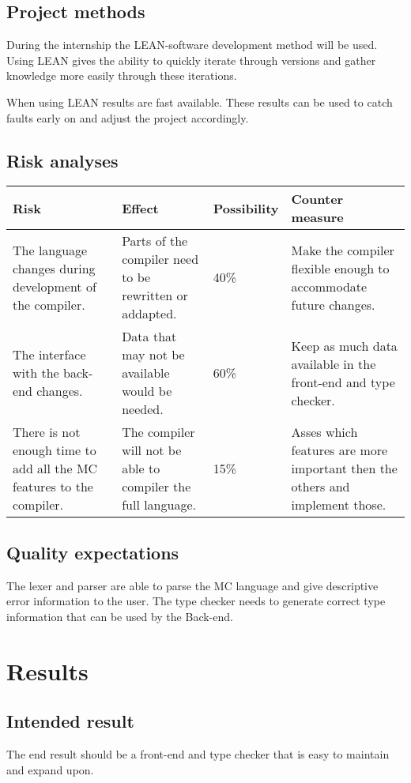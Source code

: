 \subsection{Project methods}
During the internship the LEAN-software development method will be used\cite{ries2011lean}.
Using LEAN gives the ability to quickly iterate through versions and gather knowledge more easily through these iterations.

When using LEAN results are fast available.
These results can be used to catch faults early on and adjust the project accordingly.


\subsection{Risk analyses}
\begin{center}
   \begin{tabular}
      {| p{} | p{} | l | p{} |}
      \hline
      \textbf{Risk} & \textbf{Effect} & \textbf{Possibility} & \textbf{Counter measure}
      \\ \hline
      The language changes during development of the compiler. & Parts of the compiler need to be rewritten or addapted. & 40\% & Make the compiler flexible enough to accommodate future changes.
      \\ \hline
      The interface with the back-end changes. & Data that may not be available would be needed. & 60\% & Keep as much data available in the front-end and type checker.
      \\ \hline
      There is not enough time to add all the MC features to the compiler. & The compiler will not be able to compiler the full language. & 15\% & Asses which features are more important then the others and implement those.
      \\ \hline
   \end{tabular}
\end{center}

\subsection{Quality expectations}
The lexer and parser are able to parse the MC language and give descriptive error information to
the user. The type checker needs to generate correct type information that can be used by the
Back-end.

\section{Results}
\subsection{Intended result}
The end result should be a front-end and type checker that is easy to maintain and expand upon.




\begin{appendices}
   
\end{appendices}

